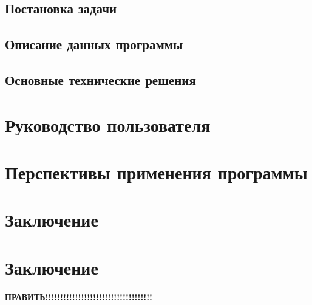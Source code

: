 \subsection{Постановка задачи}

\subsection{Описание данных программы}

\subsection{Основные технические решения}


\section{Руководство пользователя}
\setcounter{figure}{0}

\section{Перспективы применения программы}
\setcounter{figure}{0}

\section{Заключение}
\setcounter{figure}{0}

% 
% 
% 



\newpage
\section*{Заключение}
\textbf{ПРАВИТЬ!!!!!!!!!!!!!!!!!!!!!!!!!!!!!!!!!!!!}

